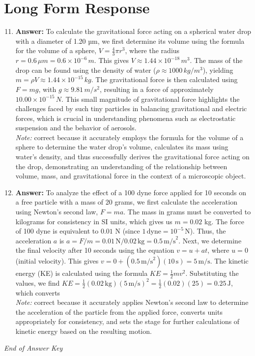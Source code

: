 \documentclass[12pt]{article}
\begin{document}
\section*{Long Form Response}
\begin{enumerate}[label=\arabic*.]
\setcounter{enumi}{10}
\item \textbf{Answer:} To calculate the gravitational force acting on a spherical water drop with a diameter of 1.20 µm, we first determine its volume using the formula for the volume of a sphere, \( V = \frac{4}{3} \pi r^3 \), where the radius \( r = 0.6 \, \mu m = 0.6 \times 10^{-6} \, m \). This gives \( V \approx 1.44 \times 10^{-18} \, m^3 \). The mass of the drop can be found using the density of water (\( \rho \approx 1000 \, kg/m^3 \)), yielding \( m = \rho V \approx 1.44 \times 10^{-15} \, kg \). The gravitational force is then calculated using \( F = mg \), with \( g \approx 9.81 \, m/s^2 \), resulting in a force of approximately \( 10.00 \times 10^{-15} \, N \). This small magnitude of gravitational force highlights the challenges faced by such tiny particles in balancing gravitational and electric forces, which is crucial in understanding phenomena such as electrostatic suspension and the behavior of aerosols.
\\ \textit{Note:} correct because it accurately employs the formula for the volume of a sphere to determine the water drop's volume, calculates its mass using water's density, and thus successfully derives the gravitational force acting on the drop, demonstrating an understanding of the relationship between volume, mass, and gravitational force in the context of a microscopic object.
\item \textbf{Answer:} To analyze the effect of a 100 dyne force applied for 10 seconds on a free particle with a mass of 20 grams, we first calculate the acceleration using Newton's second law, \( F = ma \). The mass in grams must be converted to kilograms for consistency in SI units, which gives us \( m = 0.02 \) kg. The force of 100 dyne is equivalent to \( 0.01 \) N (since \( 1 \, \text{dyne} = 10^{-5} \, \text{N} \)). Thus, the acceleration \( a \) is \( a = F/m = 0.01 \, \text{N} / 0.02 \, \text{kg} = 0.5 \, \text{m/s}^2 \). Next, we determine the final velocity after 10 seconds using the equation \( v = u + at \), where \( u = 0 \) (initial velocity). This gives \( v = 0 + (0.5 \, \text{m/s}^2)(10 \, \text{s}) = 5 \, \text{m/s} \). The kinetic energy (KE) is calculated using the formula \( KE = \frac{1}{2} mv^2 \). Substituting the values, we find \( KE = \frac{1}{2} (0.02 \, \text{kg})(5 \, \text{m/s})^2 = \frac{1}{2} (0.02)(25) = 0.25 \, \text{J} \), which converts
\\ \textit{Note:} correct because it accurately applies Newton's second law to determine the acceleration of the particle from the applied force, converts units appropriately for consistency, and sets the stage for further calculations of kinetic energy based on the resulting motion.
\end{enumerate}

\vfill
\noindent\textit{End of Answer Key}
\end{document}
